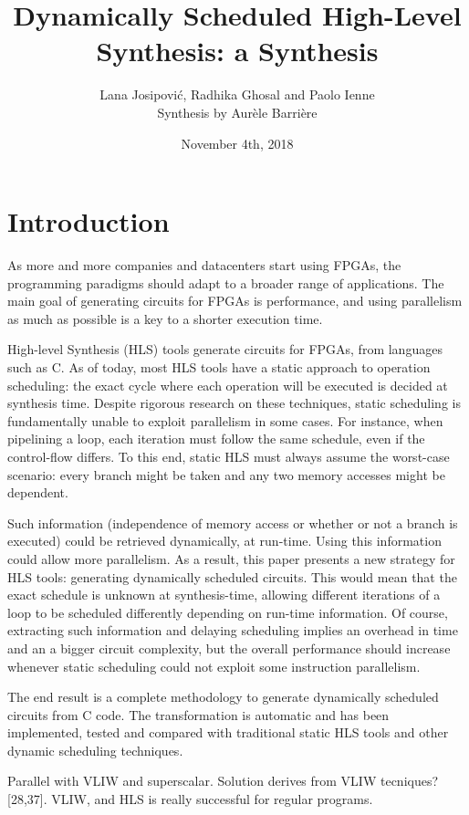 \documentclass{article}
\title{Dynamically Scheduled High-Level Synthesis: a Synthesis}
\author{Lana Josipovi\'c, Radhika Ghosal and Paolo Ienne\\ Synthesis by Aur\`ele Barri\`ere}
\date{November 4th, 2018}
\def\todo#1{{\color{red}#1}}
\begin{document}
\maketitle

\section{Introduction}
As more and more companies and datacenters start using FPGAs, the programming paradigms should adapt to a broader range of applications.
The main goal of generating circuits for FPGAs is performance, and using parallelism as much as possible is a key to a shorter execution time.

High-level Synthesis (HLS) tools generate circuits for FPGAs, from languages such as C.
As of today, most HLS tools have a static approach to operation scheduling: the exact cycle where each operation will be executed is decided at synthesis time.
Despite rigorous research on these techniques, static scheduling is fundamentally unable to exploit parallelism in some cases.
For instance, when pipelining a loop, each iteration must follow the same schedule, even if the control-flow differs. To this end, static HLS must always assume the worst-case scenario: every branch might be taken and any two memory accesses might be dependent.

Such information (independence of memory access or whether or not a branch is executed) could be retrieved dynamically, at run-time. Using this information could allow more parallelism.
As a result, this paper presents a new strategy for HLS tools: generating dynamically scheduled circuits.
This would mean that the exact schedule is unknown at synthesis-time, allowing different iterations of a loop to be scheduled differently depending on run-time information.
Of course, extracting such information and delaying scheduling implies an overhead in time and an a bigger circuit complexity, but the overall performance should increase whenever static scheduling could not exploit some instruction parallelism.

The end result is a complete methodology to generate dynamically scheduled circuits from C code. The transformation is automatic and has been implemented, tested and compared with traditional static HLS tools and other dynamic scheduling techniques.


\todo{Parallel with VLIW and superscalar. Solution derives from VLIW tecniques? [28,37].
VLIW, and HLS is really successful for regular programs.}
\end{document}
